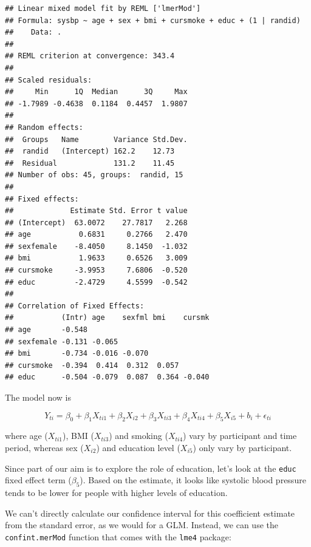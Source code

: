 \documentclass[
]{book}
\newenvironment{Shaded}{\begin{snugshade}}{\end{snugshade}}
\newcommand{\KeywordTok}[1]{\textcolor[rgb]{0.13,0.29,0.53}{\textbf{#1}}}
\newcommand{\NormalTok}[1]{#1}
\newcommand{\OperatorTok}[1]{\textcolor[rgb]{0.81,0.36,0.00}{\textbf{#1}}}
\newcommand{\StringTok}[1]{\textcolor[rgb]{0.31,0.60,0.02}{#1}}
\begin{document}
\begin{verbatim}
## Linear mixed model fit by REML ['lmerMod']
## Formula: sysbp ~ age + sex + bmi + cursmoke + educ + (1 | randid)
##    Data: .
## 
## REML criterion at convergence: 343.4
## 
## Scaled residuals: 
##     Min      1Q  Median      3Q     Max 
## -1.7989 -0.4638  0.1184  0.4457  1.9807 
## 
## Random effects:
##  Groups   Name        Variance Std.Dev.
##  randid   (Intercept) 162.2    12.73   
##  Residual             131.2    11.45   
## Number of obs: 45, groups:  randid, 15
## 
## Fixed effects:
##             Estimate Std. Error t value
## (Intercept)  63.0072    27.7817   2.268
## age           0.6831     0.2766   2.470
## sexfemale    -8.4050     8.1450  -1.032
## bmi           1.9633     0.6526   3.009
## cursmoke     -3.9953     7.6806  -0.520
## educ         -2.4729     4.5599  -0.542
## 
## Correlation of Fixed Effects:
##           (Intr) age    sexfml bmi    cursmk
## age       -0.548                            
## sexfemale -0.131 -0.065                     
## bmi       -0.734 -0.016 -0.070              
## cursmoke  -0.394  0.414  0.312  0.057       
## educ      -0.504 -0.079  0.087  0.364 -0.040
\end{verbatim}

The model now is

\[
Y_{ti} = \beta_{0} + \beta_{1}X_{ti1} + \beta_{2}X_{i2} + \beta_{3}X_{ti3} + \beta_{4}X_{ti4} + \beta_{5}X_{i5} + b_{i} + \epsilon_{ti}
\]

where age (\(X_{ti1}\)), BMI (\(X_{ti3}\)) and smoking (\(X_{ti4}\)) vary by participant
and time period, whereas sex (\(X_{i2}\)) and education level (\(X_{i5}\)) only vary by
participant.

Since part of our aim is to explore the role of education, let's look at the
\texttt{educ} fixed effect term (\(\beta_{5}\)). Based on the estimate, it looks like systolic blood
pressure tends to be lower for people with higher levels of education.

We can't directly calculate our confidence interval for this coefficient estimate
from the standard error, as we would for a GLM. Instead, we can use the
\texttt{confint.merMod} function that comes with the \texttt{lme4} package:

\begin{Shaded}
\end{Shaded}
\end{document}
